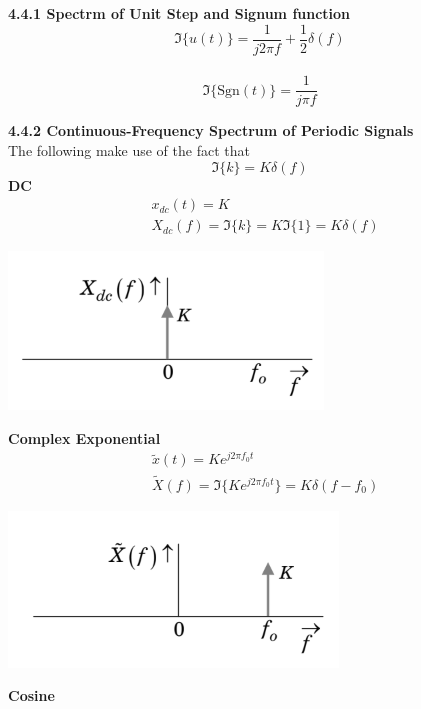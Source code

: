 \documentclass[6pt,landscape,a4paper]{extarticle}
\newenvironment{Figure}
  {\par\medskip\noindent\minipage{\linewidth}}
  {\endminipage\par\medskip}
\begin{document}
\begin{multicols*}{5}
    \textbf{4.4.1 Spectrm of Unit Step and Signum function}\\
    \[
        \Im\{u(t)\}=\frac{1}{j2\pi f} + \frac{1}{2}\delta(f)
    \]\\
    \[
        \Im\{\text{Sgn}(t)\} = \frac{1}{j\pi f}
    \]

    \textbf{4.4.2 Continuous-Frequency Spectrum of Periodic Signals}\\
    The following make use of the fact that
    \[
        \Im\{k\}=K\delta(f) \tag{4.14}
    \]
    \textbf{DC}
    \begin{align*}
        &x_{dc}(t)=K \\
        &X_{dc}(f)=\Im\{k\}=K\Im\{1\}=K\delta(f)
    \end{align*}
    \begin{Figure}
        \centering
        \includegraphics[width=0.8\linewidth]{images/continuousSpectrum_DC.png}
    \end{Figure}    
    \textbf{Complex Exponential}
    \begin{align*}
        &\tilde{x}(t) = Ke^{j2\pi f_0t} \\
        &\tilde{X}(f)=\Im\{Ke^{j2\pi f_0t}\} = K\delta(f-f_0)
    \end{align*}
    \begin{Figure}
        \centering
        \includegraphics[width=0.8\linewidth]{images/continuousSpectrum_complexExponential.png}
    \end{Figure}
    \textbf{Cosine}
    \begin{align*}

\end{align*}
\end{multicols*}
\end{document}
